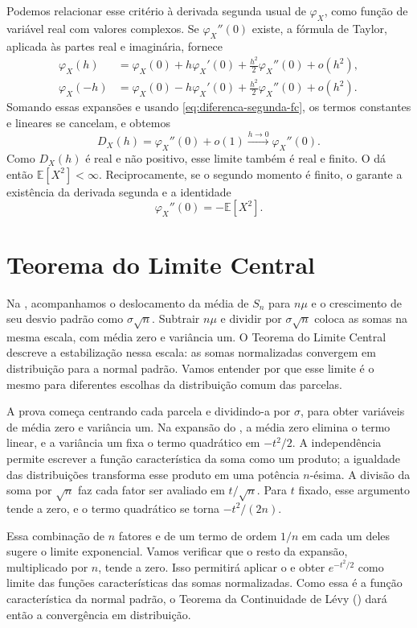 \documentclass[12pt,portuguese]{article}
\theoremstyle{definition}
\theoremstyle{plainexercise}
\theoremstyle{starredexercise}
\theoremstyle{definition}
\begin{document}
Podemos relacionar esse critério à derivada segunda usual de
$\varphi_X$, como função de variável real com valores complexos.
Se $\varphi_X''(0)$ existe, a fórmula de Taylor, aplicada às partes
real e imaginária, fornece
\begin{align*}
\varphi_X(h)
&=\varphi_X(0)+h\varphi_X'(0)
+\frac{h^2}{2}\varphi_X''(0)+o(h^2),
\\[0.3cm]
\varphi_X(-h)
&=\varphi_X(0)-h\varphi_X'(0)
+\frac{h^2}{2}\varphi_X''(0)+o(h^2).
\end{align*}
Somando essas expansões e usando
\eqref{eq:diferenca-segunda-fc}, os termos constantes e lineares
se cancelam, e obtemos
\[
D_X(h)=\varphi_X''(0)+o(1)
\xrightarrow{h\to0}\varphi_X''(0).
\]
Como $D_X(h)$ é real e não positivo, esse limite também é real
e finito. O  dá então
$\mathbb{E}[X^2]<\infty$.
Reciprocamente, se o segundo momento é finito, o
 garante a existência da derivada
segunda e a identidade
\[
\varphi_X''(0)=-\mathbb{E}[X^2].
\]


\section{Teorema do Limite Central}\label{sec:tlc}

Na , acompanhamos o deslocamento da média
de $S_n$ para $n\mu$ e o crescimento de seu desvio padrão como
$\sigma\sqrt{n}$. Subtrair $n\mu$ e dividir por $\sigma\sqrt{n}$
coloca as somas na mesma escala, com média zero e variância um.
O Teorema do Limite Central descreve a estabilização nessa escala:
as somas normalizadas convergem em distribuição para a normal padrão.
Vamos entender por que esse limite é o mesmo para diferentes escolhas
da distribuição comum das parcelas.

A prova começa centrando cada parcela e dividindo-a por $\sigma$,
para obter variáveis de média zero e variância um.
Na expansão do , a média zero elimina
o termo linear, e a variância um fixa o termo quadrático em $-t^2/2$.
A independência permite escrever a função característica da soma
como um produto; a igualdade das distribuições transforma esse produto
em uma potência $n$-ésima.
A divisão da soma por $\sqrt{n}$ faz cada fator ser avaliado em
$t/\sqrt{n}$. Para $t$ fixado, esse argumento tende a zero,
e o termo quadrático se torna $-t^2/(2n)$.

Essa combinação de $n$ fatores e de um termo de ordem $1/n$
em cada um deles sugere o limite exponencial.
Vamos verificar que o resto da expansão, multiplicado por $n$,
tende a zero. Isso permitirá aplicar o 
e obter $e^{-t^2/2}$ como limite das funções características
das somas normalizadas. Como essa é a função característica da normal
padrão, o Teorema da Continuidade de Lévy ()
dará então a convergência em distribuição.
\end{document}
